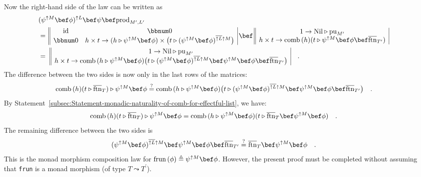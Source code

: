 Now the right-hand side of the law can be written as
\begin{align*}
 & (\psi^{\uparrow M}\bef\phi)^{\uparrow L}\bef\psi\bef\text{prod}_{M^{\prime},L^{\prime}}\\
 & =\,\begin{array}{||cc|}
\text{id} & \bbnum 0\\
\bbnum 0 & h\times t\rightarrow(h\triangleright\psi^{\uparrow M}\bef\phi)\times\big(t\triangleright(\psi^{\uparrow M}\bef\phi)^{\overline{\uparrow L}\uparrow M}\big)
\end{array}\,\bef\,\begin{array}{||c|}
1\rightarrow\text{Nil}\triangleright\text{pu}_{M^{\prime}}\\
h\times t\rightarrow\text{comb}\,(h)(t\triangleright\psi^{\uparrow M}\bef\phi\bef\overline{\text{ftn}}_{T^{\prime}})
\end{array}\\
 & =\,\,\begin{array}{||c|}
1\rightarrow\text{Nil}\triangleright\text{pu}_{M^{\prime}}\\
h\times t\rightarrow\text{comb}\,(h\triangleright\psi^{\uparrow M}\bef\phi)\big(t\triangleright(\psi^{\uparrow M}\bef\phi)^{\overline{\uparrow L}\uparrow M}\bef\psi^{\uparrow M}\bef\phi\bef\overline{\text{ftn}}_{T^{\prime}}\big)
\end{array}\quad.
\end{align*}
The difference between the two sides is now only in the last rows
of the matrices:
\[
\text{comb}\,(h)(t\triangleright\overline{\text{ftn}}_{T})\triangleright\psi^{\uparrow M}\bef\phi\overset{?}{=}\text{comb}\,(h\triangleright\psi^{\uparrow M}\bef\phi)\big(t\triangleright(\psi^{\uparrow M}\bef\phi)^{\overline{\uparrow L}\uparrow M}\bef\psi^{\uparrow M}\bef\phi\bef\overline{\text{ftn}}_{T^{\prime}}\big)\quad.
\]
By Statement~\ref{subsec:Statement-monadic-naturality-of-comb-for-effectful-list},
we have:
\[
\text{comb}\,(h)(t\triangleright\overline{\text{ftn}}_{T})\triangleright\psi^{\uparrow M}\bef\phi=\text{comb}\,(h\triangleright\psi^{\uparrow M}\bef\phi)(t\triangleright\overline{\text{ftn}}_{T}\bef\psi^{\uparrow M}\bef\phi)\quad.
\]
The remaining difference between the two sides is
\[
(\psi^{\uparrow M}\bef\phi)^{\overline{\uparrow L}\uparrow M}\bef\psi^{\uparrow M}\bef\phi\bef\overline{\text{ftn}}_{T^{\prime}}\overset{?}{=}\overline{\text{ftn}}_{T}\bef\psi^{\uparrow M}\bef\phi\quad.
\]
This is the monad morphism composition law for $\text{frun}\,(\phi)\triangleq\psi^{\uparrow M}\bef\phi$.
However, the present proof must be completed without assuming that
\lstinline!frun! is a monad morphism (of type $T\leadsto T^{\prime}$).

